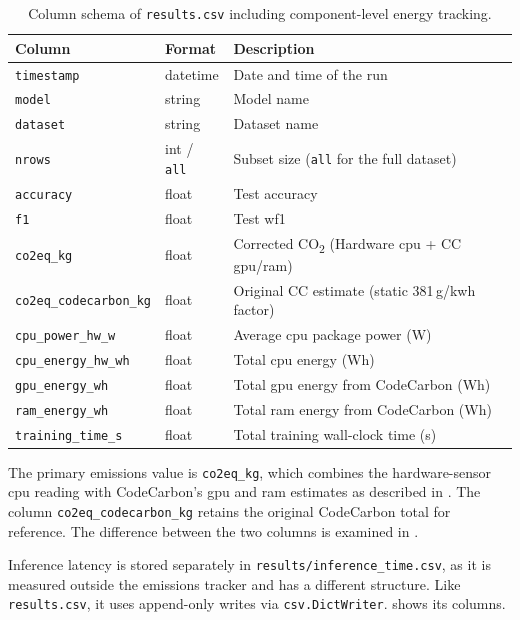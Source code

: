 \begin{table}[htbp]
\centering
\small
\caption[Column schema of \texttt{results.csv}.]{Column schema of \texttt{results.csv} including component-level energy tracking.}
\label{tab:results_schema}
\begin{tabular}{lll}
\toprule
\textbf{Column} & \textbf{Format} & \textbf{Description} \\
\midrule
\texttt{timestamp}             & datetime & Date and time of the run \\
\texttt{model}                 & string   & Model name \\
\texttt{dataset}               & string   & Dataset name \\
\texttt{nrows}                 & int / \texttt{all} & Subset size (\texttt{all} for the full dataset) \\
\texttt{accuracy}              & float    & Test accuracy \\
\texttt{f1}                    & float    & Test \gls{wf1} \\
\texttt{co2eq\_kg}             & float    & Corrected CO\textsubscript{2} (Hardware \gls{cpu} + CC \gls{gpu}/\gls{ram}) \\
\texttt{co2eq\_codecarbon\_kg} & float    & Original CC estimate (static 381\,g/\gls{kwh} factor) \\
\texttt{cpu\_power\_hw\_w}     & float    & Average \gls{cpu} package power (W) \\
\texttt{cpu\_energy\_hw\_wh}   & float    & Total \gls{cpu} energy (Wh) \\
\texttt{gpu\_energy\_wh}       & float    & Total \gls{gpu} energy from CodeCarbon (Wh) \\
\texttt{ram\_energy\_wh}       & float    & Total \gls{ram} energy from CodeCarbon (Wh) \\
\texttt{training\_time\_s}     & float    & Total training wall-clock time (s) \\
\bottomrule
\end{tabular}
\end{table}

The primary emissions value is \texttt{co2eq\_kg}, which combines the hardware-sensor \gls{cpu} reading with CodeCarbon's \gls{gpu} and \gls{ram} estimates as described in . The column \texttt{co2eq\_codecarbon\_kg} retains the original CodeCarbon total for reference. The difference between the two columns is examined in .

Inference latency is stored separately in \texttt{results/inference\_time.csv}, as it is measured outside the emissions tracker and has a different structure. Like \texttt{results.csv}, it uses append-only writes via \texttt{csv.DictWriter}.  shows its columns.

